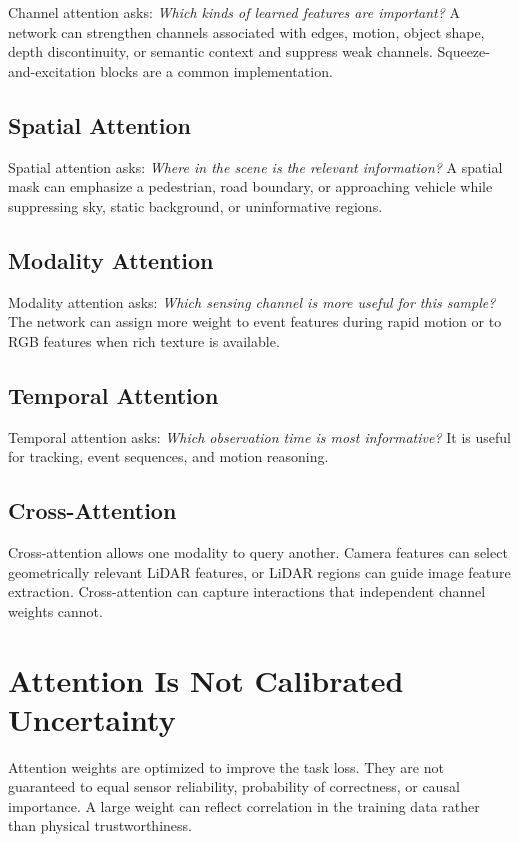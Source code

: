 Channel attention asks: \emph{Which kinds of learned features are important?} A network can strengthen channels associated with edges, motion, object shape, depth discontinuity, or semantic context and suppress weak channels. Squeeze-and-excitation blocks are a common implementation.

\subsection{Spatial Attention}

Spatial attention asks: \emph{Where in the scene is the relevant information?} A spatial mask can emphasize a pedestrian, road boundary, or approaching vehicle while suppressing sky, static background, or uninformative regions.

\subsection{Modality Attention}

Modality attention asks: \emph{Which sensing channel is more useful for this sample?} The network can assign more weight to event features during rapid motion or to RGB features when rich texture is available.

\subsection{Temporal Attention}

Temporal attention asks: \emph{Which observation time is most informative?} It is useful for tracking, event sequences, and motion reasoning.

\subsection{Cross-Attention}

Cross-attention allows one modality to query another. Camera features can select geometrically relevant LiDAR features, or LiDAR regions can guide image feature extraction. Cross-attention can capture interactions that independent channel weights cannot.

\section{Attention Is Not Calibrated Uncertainty}

Attention weights are optimized to improve the task loss. They are not guaranteed to equal sensor reliability, probability of correctness, or causal importance. A large weight can reflect correlation in the training data rather than physical trustworthiness.

